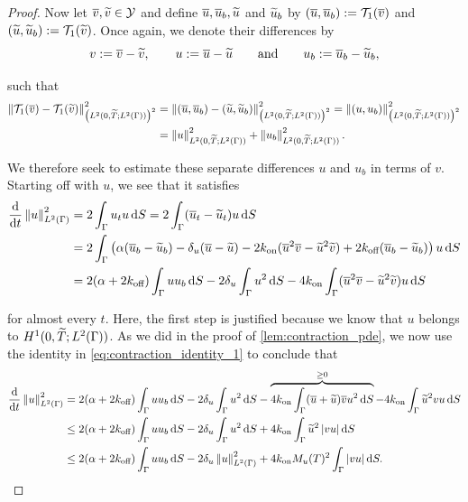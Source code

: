 \begin{proof}
    Now let $\overline{v}, \widetilde{v} \in \mathcal{Y}$ and define $\overline{u}, \overline{u}_b, \widetilde{u}$ and $\widetilde{u}_b$ by $(\overline{u}, \overline{u}_b) := \mathcal{T}_{1}(\overline{v})$ and $(\widetilde{u}, \widetilde{u}_b) := \mathcal{T}_{1}(\widetilde{v})$. Once again, we denote their differences by
%
    \begin{equation*}
        v := \overline{v} - \widetilde{v}, \qquad u := \overline{u} - \widetilde{u} \qquad \text{and} \qquad u_b := \overline{u}_b - \widetilde{u}_b,
    \end{equation*}

    \noindent
    such that
%
    \begin{align*}
        \left\| \mathcal{T}_{1} (\overline{v}) - \mathcal{T}_{1} (\widetilde{v}) \right\|_{\left(L^2(0, \widetilde{T}; L^2(\Gamma))\right)^2}^2 &= \left\| (\overline{u}, \overline{u}_b) - (\widetilde{u}, \widetilde{u}_b) \right\|_{\left(L^2(0, \widetilde{T}; L^2(\Gamma))\right)^2}^2 = \left\| (u, u_b) \right\|_{\left(L^2(0, \widetilde{T}; L^2(\Gamma))\right)^2}^2 \\
        &= \left\| u \right\|_{L^2(0, \widetilde{T}; L^2(\Gamma))}^2 + \left\| u_b \right\|_{L^2(0, \widetilde{T}; L^2(\Gamma))}^2.
    \end{align*}

    \noindent
    We therefore seek to estimate these separate differences $u$ and $u_b$ in terms of $v$. Starting off with $u$, we see that it satisfies
    \begin{equation*}
    \begin{aligned}
        \frac{\d}{\d t} \norm{u}_{\Ltwo{\Gamma}}^2 &= 2 \int_\Gamma u_t u \d S = 2 \int_\Gamma (\ub_t - \ut_t) u \d S \\
        &= 2 \int_\Gamma \left( \alpha (\ubb - \ubt) - \delta_u (\ub - \ut) - 2 \kon (\ub^2 \vb - \ut^2 \vt) + 2 \koff (\ubb - \ubt) \right) u \d S \\
        &= 2 (\alpha + 2 \koff) \int_\Gamma u u_b \d S - 2 \delta_u \int_\Gamma u^2 \d S - 4 \kon \int_\Gamma (\ub^2 \vb - \ut^2 \vt) u \d S
    \end{aligned}
    \end{equation*}

    \noindent
    for almost every $t$. Here, the first step is justified because we know that $u$ belongs to $H^1(0, \widetilde{T}; L^2(\Gamma))$. As we did in the proof of \cref{lem:contraction_pde}, we now use the identity in \cref{eq:contraction_identity_1} to conclude that
    \begin{equation*}
    \begin{aligned}
        \frac{\d}{\d t} \norm{u}_{\Ltwo{\Gamma}}^2 &= 2 (\alpha + 2 \koff) \int_\Gamma u u_b \d S - 2 \delta_u \int_\Gamma u^2 \d S - \overbrace{4 \kon \int_\Gamma (\ub + \ut) \vb u^2 \d S }^{\geq 0} - 4 \kon \int_\Gamma \ut^2 v u \d S \\
        &\leq 2 (\alpha + 2 \koff) \int_\Gamma u u_b \d S - 2 \delta_u \int_\Gamma u^2 \d S + 4 \kon \int_\Gamma \ut^2 \left| v u \right| \d S \\
        &\leq 2(\alpha + 2 \koff) \int_\Gamma u u_b \d S - 2 \delta_u \norm{u}_{\Ltwo{\Gamma}}^2 + 4 \kon M_u (T)^2 \int_\Gamma | v u | \d S . \\
    \end{aligned}
    \end{equation*}
    

\end{proof}
